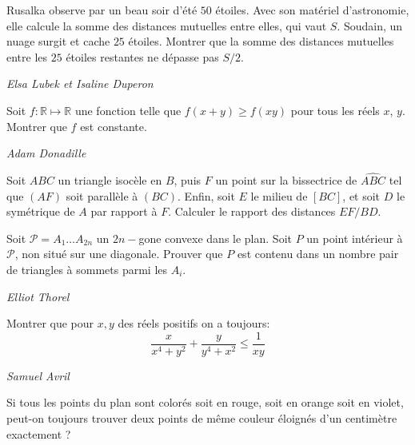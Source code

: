 \begin{exo}{}
Rusalka observe par un beau soir d'été $50$ étoiles. Avec son matériel d'astronomie, elle calcule la somme des distances mutuelles entre elles, qui vaut $S$. Soudain, un nuage surgit et cache $25$ étoiles. Montrer que la somme des distances mutuelles entre les $25$ étoiles restantes ne dépasse pas $S/2$.

\medskip
\textit{Elsa Lubek et Isaline Duperon}

\end{exo}


\begin{exo}{ }
Soit $f : \mathbb{R} \mapsto \mathbb{R}$ une fonction telle que $f(x+y) \geq f(xy)$ pour tous les réels $x$, $y$.
Montrer que $f$ est constante.

\medskip
\textit{Adam Donadille}
\end{exo}

\begin{exo}{}
Soit $ABC$ un triangle isocèle en $B$, puis $F$ un point sur la bissectrice de $\widehat{ABC}$ tel que $(AF)$ soit parallèle à $(BC)$.
Enfin, soit $E$ le milieu de $[BC]$, et soit $D$ le symétrique de $A$ par rapport à $F$.
Calculer le rapport des distances $EF / BD$.
\end{exo}

\begin{exo}{}
Soit $\mathcal{P}=A_1\ldots A_{2n}$ un $2n-$gone convexe dans le plan. Soit $P$ un point intérieur à $\mathcal{P}$, non situé sur une diagonale. Prouver que $P$ est contenu dans un nombre pair de triangles à sommets parmi les $A_i$.

\medskip
\textit{Elliot Thorel}
\end{exo}




\begin{exo}{}
Montrer que pour $x,y$ des réels positifs on a toujours:
$$\frac{x}{x^4+y^2}+\frac{y}{y^4+x^2}\leq \frac{1}{xy}$$

\medskip
\textit{Samuel Avril}
 \end{exo}

\begin{exo}{}
Si tous les points du plan sont colorés soit en rouge, soit en orange soit en violet, peut-on toujours trouver deux points de même couleur éloignés d'un centimètre exactement ?
\end{exo}


